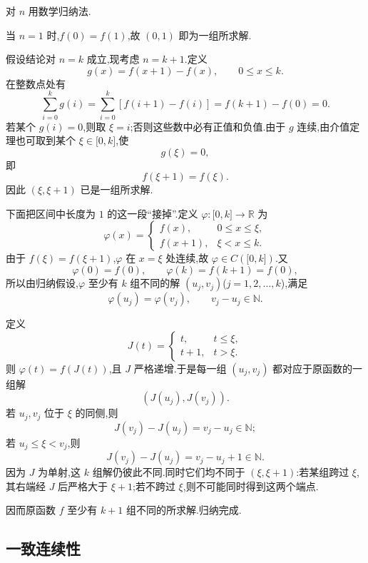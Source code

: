 \begin{solution}
    对 $n$ 用数学归纳法.

    当 $n=1$ 时,$f(0)=f(1)$,故 $(0,1)$ 即为一组所求解.

    假设结论对 $n=k$ 成立,现考虑 $n=k+1$.定义
    \[
        g(x)=f(x+1)-f(x),\qquad 0\leq x\leq k.
    \]
    在整数点处有
    \[
        \sum\limits_{i=0}^{k}g(i)
        =\sum\limits_{i=0}^{k}[f(i+1)-f(i)]
        =f(k+1)-f(0)=0.
    \]
    若某个 $g(i)=0$,则取 $\xi=i$;否则这些数中必有正值和负值.由于 $g$ 连续,由介值定理也可取到某个 $\xi\in\lbrack0,k\rbrack$,使
    \[
        g(\xi)=0,
    \]
    即
    \[
        f(\xi+1)=f(\xi).
    \]
    因此 $(\xi,\xi+1)$ 已是一组所求解.

    下面把区间中长度为 $1$ 的这一段``接掉''.定义 $\varphi:\lbrack0,k\rbrack\to\mathbb{R}$ 为
    \[
        \varphi(x)=
        \begin{cases}
            f(x),   & 0\leq x\leq\xi,\\
            f(x+1), & \xi<x\leq k.
        \end{cases}
    \]
    由于 $f(\xi)=f(\xi+1)$,$\varphi$ 在 $x=\xi$ 处连续,故 $\varphi\in C(\lbrack0,k\rbrack)$.又
    \[
        \varphi(0)=f(0),\qquad
        \varphi(k)=f(k+1)=f(0),
    \]
    所以由归纳假设,$\varphi$ 至少有 $k$ 组不同的解 $(u_j,v_j)$($j=1,2,\ldots,k$),满足
    \[
        \varphi(u_j)=\varphi(v_j),
        \qquad
        v_j-u_j\in\mathbb{N}.
    \]

    定义
    \[
        J(t)=
        \begin{cases}
            t,   & t\leq\xi,\\
            t+1, & t>\xi.
        \end{cases}
    \]
    则 $\varphi(t)=f(J(t))$,且 $J$ 严格递增.于是每一组 $(u_j,v_j)$ 都对应于原函数的一组解
    \[
        (J(u_j),J(v_j)).
    \]
    若 $u_j,v_j$ 位于 $\xi$ 的同侧,则
    \[
        J(v_j)-J(u_j)=v_j-u_j\in\mathbb{N};
    \]
    若 $u_j\leq\xi<v_j$,则
    \[
        J(v_j)-J(u_j)=v_j-u_j+1\in\mathbb{N}.
    \]
    因为 $J$ 为单射,这 $k$ 组解仍彼此不同.同时它们均不同于 $(\xi,\xi+1)$:若某组跨过 $\xi$,其右端经 $J$ 后严格大于 $\xi+1$;若不跨过 $\xi$,则不可能同时得到这两个端点.

    因而原函数 $f$ 至少有 $k+1$ 组不同的所求解.归纳完成.
\end{solution}

\subsection{一致连续性}


